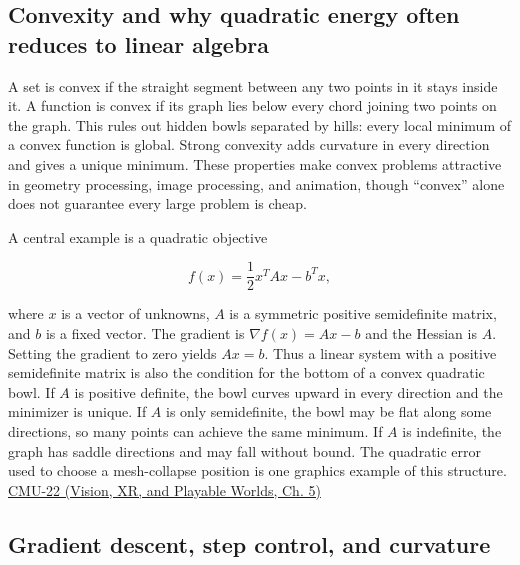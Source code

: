\subsection{Convexity and why quadratic energy often reduces to linear algebra}\label{04-visual-computing-ii-ch029-convexity-and-why-quadratic-energy-often-reduces-to-linear-algebra}

\hypertarget{04-visual-computing-ii-ch029-convexity-and-why-quadratic-energy-often-reduces-to-linear-algebra}{}

A set is convex if the straight segment between any two points in it stays inside it. A function is convex if its graph lies below every chord joining two points on the graph. This rules out hidden bowls separated by hills: every local minimum of a convex function is global. Strong convexity adds curvature in every direction and gives a unique minimum. These properties make convex problems attractive in geometry processing, image processing, and animation, though ``convex'' alone does not guarantee every large problem is cheap.

A central example is a quadratic objective

\[
f(x)=\frac12 x^T A x-b^T x,
\]

where \(x\) is a vector of unknowns, \(A\) is a symmetric positive semidefinite matrix, and \(b\) is a fixed vector. The gradient is \(\nabla f(x)=Ax-b\) and the Hessian is \(A\). Setting the gradient to zero yields \(Ax=b\). Thus a linear system with a positive semidefinite matrix is also the condition for the bottom of a convex quadratic bowl. If \(A\) is positive definite, the bowl curves upward in every direction and the minimizer is unique. If \(A\) is only semidefinite, the bowl may be flat along some directions, so many points can achieve the same minimum. If \(A\) is indefinite, the graph has saddle directions and may fall without bound. The quadratic error used to choose a mesh-collapse position is one graphics example of this structure. \href{../07-Vision-XR-and-Playable-Worlds/main.pdf\#nameddest=04-visual-computing-ii-ch036-cmu-22---optimization}{CMU-22 (Vision, XR, and Playable Worlds, Ch. 5)}

\subsection{Gradient descent, step control, and curvature}\label{04-visual-computing-ii-ch029-gradient-descent-step-control-and-curvature}

\hypertarget{04-visual-computing-ii-ch029-gradient-descent-step-control-and-curvature}{}

